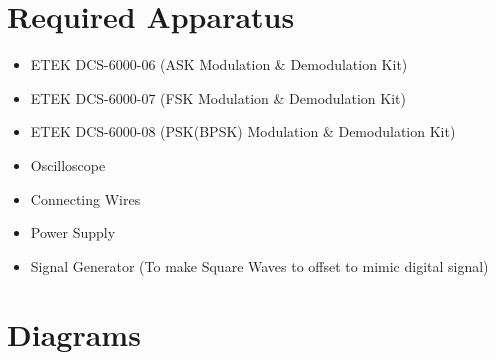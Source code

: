 \documentclass[12pt]{article}
\begin{document}
\section*{Required Apparatus}
\begin{itemize}
    \item ETEK DCS-6000-06 (ASK Modulation \& Demodulation Kit)
    \item ETEK DCS-6000-07 (FSK Modulation \& Demodulation Kit)
    \item ETEK DCS-6000-08 (PSK(BPSK) Modulation \& Demodulation Kit)
    \item Oscilloscope
    \item Connecting Wires
    \item Power Supply
    \item Signal Generator (To make Square Waves to offset to mimic digital signal)
\end{itemize}

\section*{Diagrams}
\end{document}
